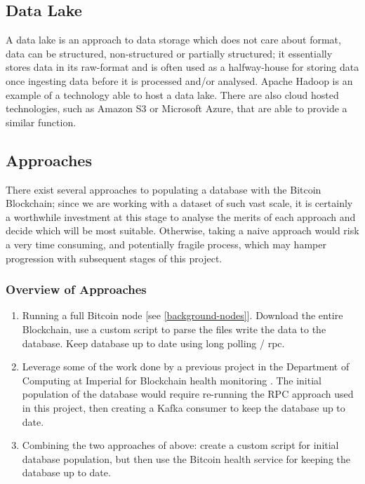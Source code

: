\subsection{Data Lake}
A data lake is an approach to data storage which does not care about format, data can be structured, non-structured or partially structured; it essentially stores data in its raw-format and is often used as a halfway-house for storing data once ingesting data before it is processed and/or analysed. Apache Hadoop is an example of a technology able to host a data lake. There are also cloud hosted technologies, such as Amazon S3 or Microsoft Azure, that are able to provide a similar function. 

\subsection{Approaches}
There exist several approaches to populating a database with the Bitcoin Blockchain; since we are working with a dataset of such vast scale, it is certainly a worthwhile investment at this stage to analyse the merits of each approach and decide which will be most suitable. Otherwise, taking a naive approach would risk a very time consuming, and potentially fragile process, which may hamper progression with subsequent stages of this project. 



\subsubsection{Overview of Approaches}
\begin{enumerate}
    \item Running a full Bitcoin node [see \ref{background-nodes}]. Download the entire Blockchain, use a custom script to parse the files write the data to the database. Keep database up to date using long polling / \gls{rpc}. 
    \item Leverage some of the work done by a previous project in the Department of Computing at Imperial for Blockchain health monitoring \cite{RefWorks:doc:5c6bd151e4b041254f892045}. The initial population of the database would require re-running the RPC approach used in this project, then creating a Kafka consumer to keep the database up to date. 
    \item Combining the two approaches of above: create a custom script for initial database population, but then use the Bitcoin health service for keeping the database up to date. 
\end{enumerate}


